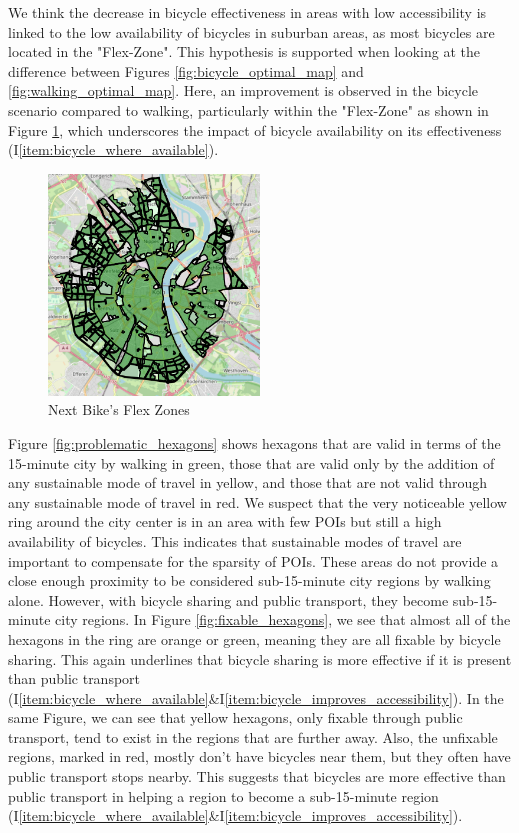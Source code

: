 We think the decrease in bicycle effectiveness in areas with low accessibility is linked to the low availability of bicycles in suburban areas, as most bicycles are located in the "Flex-Zone".
This hypothesis is supported when looking at the difference between Figures \ref{fig:bicycle_optimal_map} and \ref{fig:walking_optimal_map}. 
Here, an improvement is observed in the bicycle scenario compared to walking, particularly within the "Flex-Zone" as shown in Figure \ref{fig:flex_zones}, which underscores the impact of bicycle availability on its effectiveness (I\ref{item:bicycle_where_available}).
\begin{figure}
  \begin{center}
    \includegraphics[width=0.50\textwidth]{Figures/discussion/flex_zones.png}
  \end{center}
  \caption{Next Bike's Flex Zones}
  \label{fig:flex_zones}
\end{figure}

Figure \ref{fig:problematic_hexagons} shows hexagons that are valid in terms of the 15-minute city by walking in green, those that are valid only by the addition of any sustainable mode of travel in yellow, and those that are not valid through any sustainable mode of travel in red.
We suspect that the very noticeable yellow ring around the city center is in an area with few POIs but still a high availability of bicycles.
This indicates that sustainable modes of travel are important to compensate for the sparsity of POIs.
These areas do not provide a close enough proximity to be considered sub-15-minute city regions by walking alone.
However, with bicycle sharing and public transport, they become sub-15-minute city regions.
In Figure \ref{fig:fixable_hexagons}, we see that almost all of the hexagons in the ring are orange or green, meaning they are all fixable by bicycle sharing. 
This again underlines that bicycle sharing is more effective if it is present than public transport (I\ref{item:bicycle_where_available}\&I\ref{item:bicycle_improves_accessibility}).
In the same Figure, we can see that yellow hexagons, only fixable through public transport, tend to exist in the regions that are further away.
Also, the unfixable regions, marked in red,  mostly don't have bicycles near them, but they often have public transport stops nearby.
This suggests that bicycles are more effective than public transport in helping a region to become a sub-15-minute region (I\ref{item:bicycle_where_available}\&I\ref{item:bicycle_improves_accessibility}).

